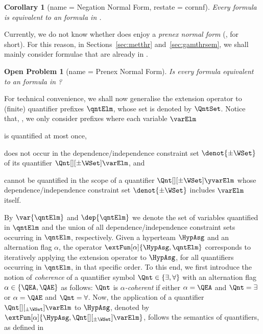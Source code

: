\documentclass[authoryear]{elsarticle}
\newtheorem{corollary}{Corollary}
\newtheorem{openproblem}{Open Problem}
\begin{document}
\begin{corollary}[name = Negation Normal Form, restate = cornnf]
  \label{cor:nnf}
  Every \ADIF formula is equivalent to an \ADIF formula in \nnf.
\end{corollary}

Currently, we do not know whether \ADIF does enjoy a \emph{prenex normal form}
(\pnf, for short).
For this reason, in Sections~\ref{sec:metthr} and~\ref{sec:gamthrsem}, we shall
mainly consider formulae that are already in \pnf.

\begin{openproblem}[name = \ADIF Prenex Normal Form]
  \label{opn:adifpnf}
  Is every \ADIF formula equivalent to an \ADIF formula in \pnf?
\end{openproblem}

For technical convenience, we shall now generalise the extension operator to
(finite) quantifier prefixes $\qntElm$, whose set is denoted by $\QntSet$.
Notice that, \wlogx, we only consider prefixes where each variable $\varElm$
\label{pag:Qassumption}
\begin{inparaenum}[(i)]
\item
  is quantified at most once,
\item
  does not occur in the dependence/independence constraint set
  $\denot{\pm\WSet}$ of its quantifier $\Qnt[][\pm\WSet] \varElm$, and
\item
  cannot be quantified in the scope of a quantifier $\Qnt[][\pm\WSet] \yvarElm$
  whose dependence/independence constraint set $\denot{\pm\WSet}$ includes
  $\varElm$ itself.
\end{inparaenum}
By $\var{\qntElm}$ and $\dep{\qntElm}$ we denote the set of variables quantified
in $\qntElm$ and the union of all dependence/independence constraint sets
occurring in $\qntElm$, respectively.
%
Given a hyperteam $\HypAsg$ and an alternation flag $\alpha$, the operator
$\extFun[\alpha]{\HypAsg, \qntElm}$ corresponds to iteratively applying the
extension operator to $\HypAsg$, for all quantifiers occurring in $\qntElm$, in
that specific order.
To this end, we first introduce the notion of \emph{coherence} of a quantifier
symbol $\Qnt \in \{ \exists, \forall \}$ with an alternation flag $\alpha \in \{
\QEA, \QAE \}$ as follows: $\Qnt$ is \emph{$\alpha$-coherent} if either $\alpha
= \QEA$ and $\Qnt = \exists$ or $\alpha = \QAE$ and $\Qnt = \forall$.
Now, the application of a quantifier $ \Qnt[][_{\pm\WSet}] \varElm$ to
$\HypAsg$, denoted by $\extFun[\alpha]{\HypAsg, \Qnt[][_{\pm\WSet}] \varElm}$,
follows the semantics of quantifiers, as defined in
\end{document}
